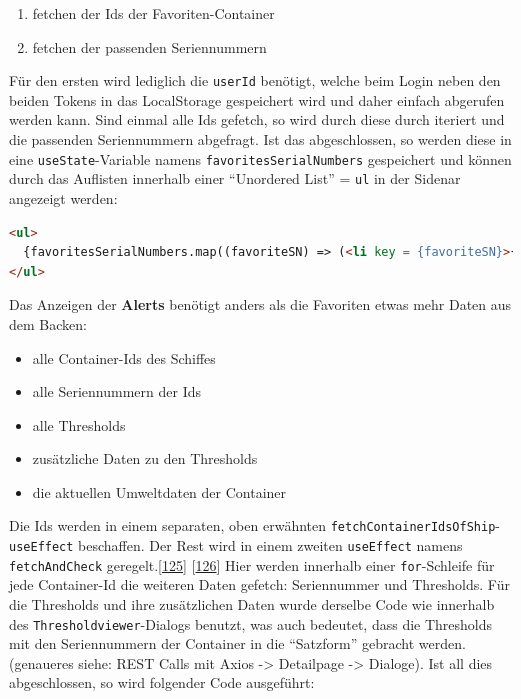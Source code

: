 \documentclass[
    headings=optiontotocandhead,%
    twoside,
    numbers=noenddot,%
    12pt, %
    titlepage, %
    parskip=full, %
    listof=leveldown, 
    numbers=noenddot, %
    a4paper,DIV=14,
    BCOR=15mm,
]{scrbook}
\newcommand{\passthrough}[1]{#1}
\providecommand{\tightlist}{%
  \setlength{\itemsep}{0pt}\setlength{\parskip}{0pt}}
\begin{document}
\begin{enumerate}
\def\labelenumi{\arabic{enumi}.}
\tightlist
\item
  fetchen der Ids der Favoriten-Container
\item
  fetchen der passenden Seriennummern
\end{enumerate}

Für den ersten wird lediglich die \passthrough{\lstinline!userId!}
benötigt, welche beim Login neben den beiden Tokens in das LocalStorage
gespeichert wird und daher einfach abgerufen werden kann. Sind einmal
alle Ids gefetch, so wird durch diese durch iteriert und die passenden
Seriennummern abgefragt. Ist das abgeschlossen, so werden diese in eine
\passthrough{\lstinline!useState!}-Variable namens
\passthrough{\lstinline!favoritesSerialNumbers!} gespeichert und können
durch das Auflisten innerhalb einer ``Unordered List'' =
\passthrough{\lstinline!ul!} in der Sidenar angezeigt werden:

\begin{lstlisting}[language=HTML, caption={Ungeordnete Liste der Favoriten}]
<ul>
  {favoritesSerialNumbers.map((favoriteSN) => (<li key = {favoriteSN}>{favoriteSN}</li>))}
</ul>
\end{lstlisting}

Das Anzeigen der \textbf{Alerts} benötigt anders als die Favoriten etwas
mehr Daten aus dem Backen:

\begin{itemize}
\tightlist
\item
  alle Container-Ids des Schiffes
\item
  alle Seriennummern der Ids
\item
  alle Thresholds
\item
  zusätzliche Daten zu den Thresholds
\item
  die aktuellen Umweltdaten der Container
\end{itemize}

Die Ids werden in einem separaten, oben erwähnten
\passthrough{\lstinline!fetchContainerIdsOfShip!}-\passthrough{\lstinline!useEffect!}
beschaffen. Der Rest wird in einem zweiten
\passthrough{\lstinline!useEffect!} namens
\passthrough{\lstinline!fetchAndCheck!}
geregelt.{[}\protect\hyperlink{ref-gpt-FetchAndCheckFixEins}{125}{]}
{[}\protect\hyperlink{ref-gpt-FetchAndCheckFixZwei}{126}{]} Hier werden
innerhalb einer \passthrough{\lstinline!for!}-Schleife für jede
Container-Id die weiteren Daten gefetch: Seriennummer und Thresholds.
Für die Thresholds und ihre zusätzlichen Daten wurde derselbe Code wie
innerhalb des \passthrough{\lstinline!Thresholdviewer!}-Dialogs benutzt,
was auch bedeutet, dass die Thresholds mit den Seriennummern der
Container in die ``Satzform'' gebracht werden. (genaueres siehe: REST
Calls mit Axios -\textgreater{} Detailpage -\textgreater{} Dialoge). Ist
all dies abgeschlossen, so wird folgender Code ausgeführt:
\end{document}
